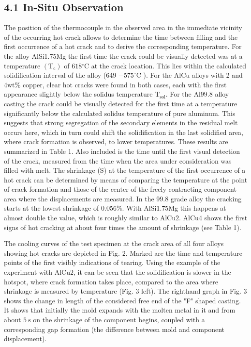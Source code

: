 \documentclass[10pt]{article}
\begin{document}
\subsection*{4.1 In-Situ Observation}
The position of the thermocouple in the observed area in the immediate vicinity of the occurring hot crack allows to determine the time between filling and the first occurrence of a hot crack and to derive the corresponding temperature. For the alloy AlSi1.75Mg the first time the crack could be visually detected was at a temperature $\left(\mathrm{T}_{\mathrm{c}}\right)$ of $618{ }^{\circ} \mathrm{C}$ at the crack location. This lies within the calculated solidification interval of the alloy (649 $-575^{\circ} \mathrm{C}$ ). For the $\mathrm{AlCu}$ alloys with 2 and $4 \mathrm{wt} \%$ copper, clear hot cracks were found in both cases, each with the first appearance slightly below the solidus temperature $\mathrm{T}_{\mathrm{sol}}$. For the $\mathrm{Al} 99.8$ alloy casting the crack could be visually detected for the first time at a temperature significantly below the calculated solidus temperature of pure aluminum. This suggests that strong segregation of the secondary elements in the residual melt occurs here, which in turn could shift the solidification in the last solidified area, where crack formation is observed, to lower temperatures. These results are summarized in Table 1. Also included is the time until the first visual detection of the crack, measured from the time when the area under consideration was filled with melt. The shrinkage (S) at the temperature of the first occurrence of a hot crack can be determined by means of comparing the temperature at the point of crack formation and those of the center of the freely contracting component area where the displacements are measured. In the 99.8 grade alloy the cracking starts at the lowest shrinkage of $0.056 \%$. With AlSi1.75Mg this happens at almost double the value, which is roughly similar to $\mathrm{AlCu} 2$. $\mathrm{AlCu} 4$ shows the first signs of hot cracking at about four times the amount of shrinkage (see Table 1).

The cooling curves of the test specimen at the crack area of all four alloys showing hot cracks are depicted in Fig. 2. Marked are the time and temperature points of the first visibly indications of tearing. Using the example of the experiment with $\mathrm{AlCu} 2$, it can be seen that the solidification is slower in the hotspot, where crack formation takes place, compared to the area where shrinkage is measured by temperature (Fig. 3 left). The righthand graph in Fig. 3 shows the change in length of the considered free end of the "F" shaped casting. It shows that initially the mold expands with the molten metal in it and from about $5 \mathrm{~s}$ on the shrinkage of the component begins, coupled with a corresponding gap formation (the difference between mold and component displacement).
\end{document}
